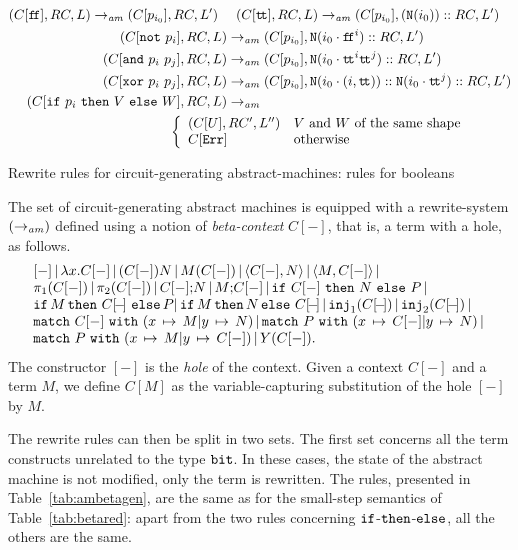\documentclass{article}
\theoremstyle{plain}
\theoremstyle{definition}
\newcommand{\bit}{{\tt bit}}
\newcommand{\cnotgate}[2]{{\tt N}({#1}\cdot{#2})}
\newcommand{\notgate}[1]{{\tt N}({#1})}
\newcommand{\define}[1]{{\em #1}}
\newcommand{\bor}{\,{|}\,}
\newcommand{\letunitterm}[2]{{#1}\mathtt{;}{#2}}
\newcommand{\ttrue}{\mathtt{t\!t}}
\newcommand{\ffalse}{\mathtt{f\!f}}
\newcommand{\iftermx}[3]{{{\mathtt{if}}~{#1}~\mathtt{then}~{#2}~\mathtt{else}~{#3}}}
\newcommand{\inj}{{\tt inj}}
\newcommand{\match}[5]{{{\mathtt{match}}~{#1}~{\mathtt{with}}~({#2\,\mapsto\,#3}\vert{#4\,\mapsto\,#5})}}
\newcommand{\errorlist}{{\tt Err}}
\newcommand{\rwam}{\mathrel{\to_{\it am}}}
\begin{document}
\begin{table}[t]
  {\begin{align*}
  (C[\ffalse],RC,L)\rwam(C[p_{i_0}], RC, L')
  ~~&~~
  (C[\ttrue],RC,L)\rwam(C[p_{i_0}], (\notgate{i_0})::RC,
  L')
  \\
  (C[{\tt not}~p_i],RC,L)&\rwam(C[p_{i_0}],\cnotgate{i_0}{\ffalse^i}::RC,
  L')
  \\
  (C[{\tt and}~p_i~p_j],RC,L)&\rwam(C[p_{i_0}],
  \cnotgate{i_0}{\ttrue^i\ttrue^j} :: RC, L')
  \\
  (C[{\tt xor}~p_i~p_j],RC,L)&\rwam(C[p_{i_0}],\cnotgate{i_0}{(i,\ttrue)}::
  \cnotgate{i_0}{\ttrue^j}::RC, L')
  \\
  (C[\iftermx{p_i}{V}{W}], RC, L)&\rwam
                                   \\
     &\hspace{-10ex}
  \left\{
    \begin{array}{l@{\quad}l}
      (C[U], RC',L'') & \textrm{$V$ and $W$ of the same shape}
      \\
      C[\errorlist] & \textrm{otherwise}
    \end{array}\right.
  \end{align*}}
\caption{Rewrite rules for circuit-generating abstract-machines: rules
for booleans}
\label{tab:rw-abm}
\end{table}


The set of circuit-generating abstract machines is equipped with a
rewrite-system $(\rwam)$ defined using a notion of
\define{beta-context} $C[-]$, that is, a term with a hole, as follows.
\[
\begin{array}{l}
[-]
\bor
\lambda x.C[-] \bor (C[-])N \bor M(C[-]) \bor
\prodterm{C[-],N} \bor
\prodterm{M,C[-]} \bor
\\
\pi_1(C[-]) \bor
\pi_2(C[-]) \bor
\letunitterm{C[-]}{N} \bor
\letunitterm{M}{C[-]} \bor
\iftermx{C[-]}{N}{P} \bor
\\
\iftermx{\!M\!}{C[\!-\!]}{\!P\!} \bor
\iftermx{\!M\!}{\!N\!}{C[\!-\!]} \bor
\inj_1(C[\!-\!]) \bor 
\inj_2(C[\!-\!]) \bor
\\
\match{C[-]}{x}{M}{y}{N} \bor
\match{P}{x}{C[-]}{y}{N} \bor
\\
\match{P}{x}{M}{y}{C[-]} \bor
  Y(C[-]).
\end{array}
\]
The constructor $[-]$ is the \define{hole} of the context. Given a
context $C[-]$ and a term $M$, we define $C[M]$ as the
variable-capturing substitution of the hole $[-]$ by $M$.


The rewrite rules can then be split in two sets. The first set
concerns all the term constructs unrelated to the type $\bit$. In
these cases, the state of the abstract machine is not modified, only
the term is rewritten. The rules, presented in
Table~\ref{tab:ambetagen}, are the same as for the small-step
semantics of Table~\ref{tab:betared}: apart from the two rules
concerning ${\tt if}$-${\tt then}$-${\tt else}$, all the others are
the same.
\end{document}

